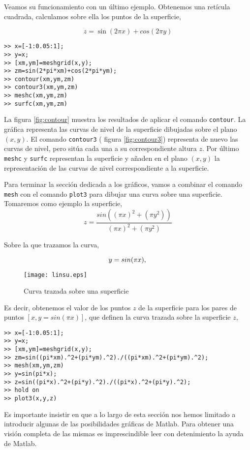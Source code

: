 Veamos su funcionamiento con un último ejemplo. Obtenemos una retícula cuadrada, calculamos sobre ella los puntos de la superficie,

\begin{equation*}
z=\sin(2\pi x)+cos(2\pi y)
\end{equation*}

\begin{verbatim}
>> x=[-1:0.05:1];
>> y=x;
>> [xm,ym]=meshgrid(x,y);
>> zm=sin(2*pi*xm)+cos(2*pi*ym);
>> contour(xm,ym,zm)
>> contour3(xm,ym,zm)
>> meshc(xm,ym,zm)
>> surfc(xm,ym,zm)
\end{verbatim}



La figura \ref{fig:contour} muestra los resultados de aplicar el comando \texttt{contour}. La gráfica representa las curvas de nivel de la superficie dibujadas sobre el plano $(x,y)$. El comando \texttt{contour3} ( figura \ref{fig:contour3}) representa de nuevo las curvas de nivel, pero sitúa cada una a su correspondiente altura $z$.  Por último \texttt{meshc} y \texttt{surfc} representan la superficie y añaden en el plano $(x,y)$ la representación de las curvas de nivel correspondiente a la superficie.

Para terminar la sección dedicada a los gráficos, vamos a combinar el comando \texttt{mesh} con el comando \texttt{plot3} para dibujar una curva sobre una superficie. Tomaremos como ejemplo la superficie,
\begin{equation*}
z=\frac{sin\left((\pi x)^2+(\pi y^2)\right)}{(\pi x)^2+(\pi y^2)}
\end{equation*}

Sobre la que trazamos la curva,

\begin{equation*}
y=sin(\pi x),\\
\end{equation*}

\begin{figure}[h]
\centering
\texttt{[image: linsu.eps]}
\caption{Curva trazada sobre una superficie}
\label{fig:cvsurf}
\end{figure}

Es decir, obtenemos el valor de los puntos $z$ de la superficie para los pares de puntos $[x, y = sin(\pi x)]$, que definen la curva trazada sobre la superficie $z$,

\begin{verbatim}
>> x=[-1:0.05:1];
>> y=x;
>> [xm,ym]=meshgrid(x,y);
>> zm=sin((pi*xm).^2+(pi*ym).^2)./((pi*xm).^2+(pi*ym).^2);
>> mesh(xm,ym,zm)
>> y=sin(pi*x);
>> z=sin((pi*x).^2+(pi*y).^2)./((pi*x).^2+(pi*y).^2);
>> hold on
>> plot3(x,y,z)
\end{verbatim}

Es importante insistir en que a lo largo de esta sección nos hemos limitado a introducir algunas de las posibilidades gráficas de Matlab. Para obtener una visión completa de las mismas es imprescindible leer con detenimiento la ayuda de Matlab.